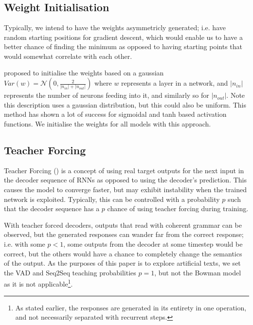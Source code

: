 \documentclass[12pt,twoside]{report}
\begin{document}

\subsection*{Weight Initialisation}

Typically, we intend to have the weights asymmetricly generated; i.e. have random starting positions for gradient descent, which would enable us to have a better chance of finding the minimum as opposed to having starting points that would somewhat correlate with each other.

\cite{glorot_understanding_2010} proposed to initialise the weights based on a gaussian $Var(w)=\mathcal{N}(0,\frac{2}{|n_{in}| + |n_{out}| })$ where $w$ represents a layer in a network, and $|n_{in}|$ represents the number of neurons feeding into it, and similarly so for $|n_{out}|$. Note this description uses a gaussian distribution, but this could also be uniform. This method has shown a lot of success for sigmoidal and tanh based activation functions. We initialise the weights for all models with this approach.

\subsection*{Teacher Forcing}

Teacher Forcing (\cite{williams_learning_1989}) is a concept of using real target outputs for the next input in the decoder sequence of RNNs as opposed to using the decoder's prediction. This causes the model to converge faster, but may exhibit instability when the trained network is exploited. Typically, this can be controlled with a probability $p$ such that the decoder sequence has a $p$ chance of using teacher forcing during training.

With teacher forced decoders, outputs that read with coherent grammar can be observed, but the generated responses can wander far from the correct response; i.e. with some $p<1$, some outputs from the decoder at some timestep would be correct, but the others would have a chance to completely change the semantics of the output. As the purposes of this paper is to explore artificial texts, we set the VAD and Seq2Seq teaching probabilities $p=1$, but not the Bowman model as it is not applicable\footnote{As stated earlier, the responses are generated in its entirety in one operation, and not necessarily separated with  recurrent steps.}.
\end{document}
